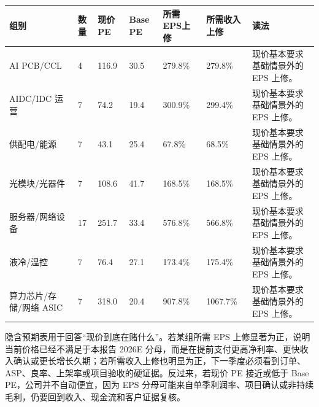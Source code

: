 \begin{exhibitbox}
\scriptsize
\begin{tabularx}{\linewidth}{L{2.2cm}R{0.8cm}R{1.45cm}R{1.25cm}R{1.6cm}R{1.7cm}X}
\toprule
\textbf{组别} & \textbf{数量} & \textbf{现价PE} & \textbf{Base PE} & \textbf{所需EPS上修} & \textbf{所需收入上修} & \textbf{读法}\\
\midrule
AI PCB/CCL & 4 & 116.9 & 30.5 & 279.8\% & 279.8\% & 现价基本要求基础情景外的 EPS 上修。\\
AIDC/IDC 运营 & 7 & 74.2 & 19.4 & 300.9\% & 299.4\% & 现价基本要求基础情景外的 EPS 上修。\\
供配电/能源 & 7 & 43.1 & 25.4 & 67.8\% & 68.5\% & 现价基本要求基础情景外的 EPS 上修。\\
光模块/光器件 & 7 & 108.6 & 41.7 & 168.5\% & 168.5\% & 现价基本要求基础情景外的 EPS 上修。\\
服务器/网络设备 & 17 & 251.7 & 33.4 & 576.8\% & 566.8\% & 现价基本要求基础情景外的 EPS 上修。\\
液冷/温控 & 7 & 76.4 & 27.1 & 173.4\% & 175.4\% & 现价基本要求基础情景外的 EPS 上修。\\
算力芯片/存储/网络 ASIC & 7 & 318.0 & 20.4 & 907.8\% & 1067.7\% & 现价基本要求基础情景外的 EPS 上修。\\
\bottomrule
\end{tabularx}
\end{exhibitbox}

隐含预期表用于回答“现价到底在赌什么”。若某组所需 EPS 上修显著为正，说明当前价格已经不满足于本报告 2026E 分母，而是在提前支付更高净利率、更快收入确认或更长增长久期；若所需收入上修也明显为正，下一季度必须看到订单、ASP、良率、上架率或项目验收的硬证据。反过来，若现价 PE 接近或低于 Base PE，公司并不自动便宜，因为 EPS 分母可能来自单季利润率、项目确认或非持续毛利，仍要回到收入、现金流和客户证据复核。

